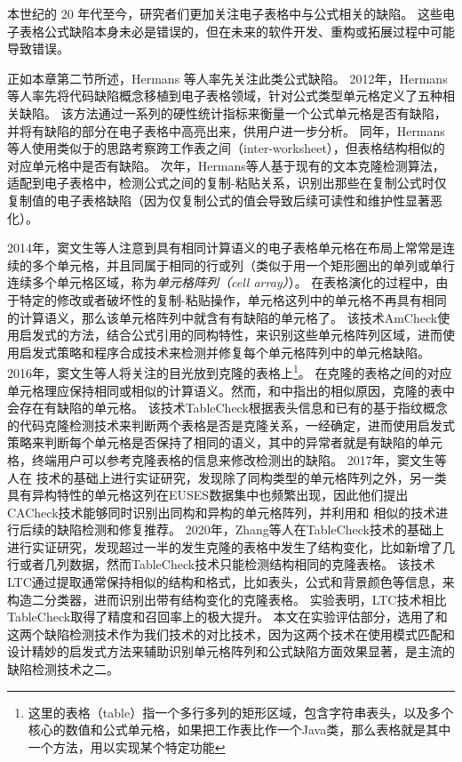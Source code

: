本世纪的 20 年代至今，研究者们更加关注电子表格中与公式相关的缺陷。
这些电子表格公式缺陷本身未必是错误的，但在未来的软件开发、重构或拓展过程中可能导致错误。

正如本章第二节所述，Hermans 等人\cite{hermans2012detecting,hermans2012detecting2,hermans2013data}率先关注此类公式缺陷。
2012年，Hermans等人\cite{hermans2012detecting2}率先将代码缺陷概念移植到电子表格领域，针对公式类型单元格定义了五种相关缺陷。
该方法通过一系列的硬性统计指标来衡量一个公式单元格是否有缺陷，并将有缺陷的部分在电子表格中高亮出来，供用户进一步分析。
同年，Hermans等人\cite{hermans2012detecting}使用类似于\cite{hermans2012detecting2}的思路考察跨工作表之间（inter-worksheet），但表格结构相似的对应单元格中是否有缺陷。
次年，Hermans等人\cite{hermans2013data}基于现有的文本克隆检测算法，适配到电子表格中，检测公式之间的复制-粘贴关系，识别出那些在复制公式时仅复制值的电子表格缺陷（因为仅复制公式的值会导致后续可读性和维护性显著恶化）。

2014年，窦文生等人\cite{dou2014spreadsheet}注意到具有相同计算语义的电子表格单元格在布局上常常是连续的多个单元格，并且同属于相同的行或列（类似于用一个矩形圈出的单列或单行连续多个单元格区域，称为\textit{单元格阵列（cell array）}）。
在表格演化的过程中，由于特定的修改或者破坏性的复制-粘贴操作，单元格这列中的单元格不再具有相同的计算语义，那么该单元格阵列中就含有有缺陷的单元格了。
该技术AmCheck使用启发式的方法，结合公式引用的同构特性，来识别这些单元格阵列区域，进而使用启发式策略和程序合成技术来检测并修复每个单元格阵列中的单元格缺陷。
2016年，窦文生等人\cite{dou2016detecting}将关注的目光放到克隆的表格上\footnote{这里的表格（table）指一个多行多列的矩形区域，包含字符串表头，以及多个核心的数值和公式单元格，如果把工作表比作一个Java类，那么表格就是其中一个方法，用以实现某个特定功能}。
在克隆的表格之间的对应单元格理应保持相同或相似的计算语义。然而，和\cite{dou2014spreadsheet}中指出的相似原因，克隆的表中会存在有缺陷的单元格。
该技术TableCheck根据表头信息和已有的基于指纹概念的代码克隆检测技术来判断两个表格是否是克隆关系，一经确定，进而使用启发式策略来判断每个单元格是否保持了相同的语义，其中的异常者就是有缺陷的单元格，终端用户可以参考克隆表格的信息来修改检测出的缺陷。
2017年，窦文生等人\cite{dou2017cacheck}在 \am 技术的基础上进行实证研究，发现除了同构类型的单元格阵列之外，另一类具有异构特性的单元格这列在EUSES数据集中也频繁出现，因此他们提出CACheck技术能够同时识别出同构和异构的单元格阵列，并利用和 \am 相似的技术进行后续的缺陷检测和修复推荐。
2020年，Zhang等人\cite{zhang2020learning}在TableCheck技术的基础上进行实证研究，发现超过一半的发生克隆的表格中发生了结构变化，比如新增了几行或者几列数据，然而TableCheck技术只能检测结构相同的克隆表格。
该技术LTC通过提取通常保持相似的结构和格式，比如表头，公式和背景颜色等信息，来构造二分类器，进而识别出带有结构变化的克隆表格。
实验表明，LTC技术相比TableCheck取得了精度和召回率上的极大提升。
本文在实验评估部分，选用了\am 和 \ca 这两个缺陷检测技术作为我们\wa 技术的对比技术，因为这两个技术在使用模式匹配和设计精妙的启发式方法来辅助识别单元格阵列和公式缺陷方面效果显著，是主流的缺陷检测技术之二。

